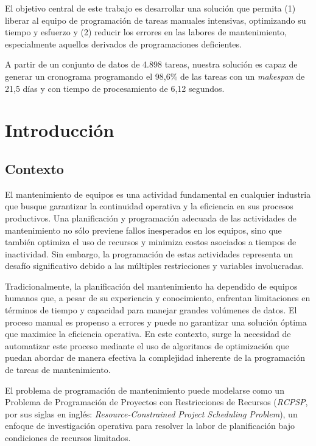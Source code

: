 \documentclass{article}
\begin{document}
El objetivo central de este trabajo es desarrollar una solución que permita (1) liberar al equipo de programación de tareas manuales intensivas, optimizando su tiempo y esfuerzo y (2) reducir los errores en las labores de mantenimiento, especialmente aquellos derivados de programaciones deficientes.

A partir de un conjunto de datos de 4.898 tareas, nuestra solución es capaz de generar un cronograma programando el 98,6\% de las tareas con un \textit{makespan} de 21,5 días y con tiempo de procesamiento de 6,12 segundos.
\newpage

\tableofcontents[hideallsubsections]
\newpage

\section{Introducción}

\subsection{Contexto}
El mantenimiento de equipos es una actividad fundamental en cualquier industria que busque garantizar la continuidad operativa y la eficiencia en sus procesos productivos. Una planificación y programación adecuada de las actividades de mantenimiento no sólo previene fallos inesperados en los equipos, sino que también optimiza el uso de recursos y minimiza costos asociados a tiempos de inactividad. Sin embargo, la programación de estas actividades representa un desafío significativo debido a las múltiples restricciones y variables involucradas.

Tradicionalmente, la planificación del mantenimiento ha dependido de equipos humanos que, a pesar de su experiencia y conocimiento, enfrentan limitaciones en términos de tiempo y capacidad para manejar grandes volúmenes de datos. El proceso manual es propenso a errores y puede no garantizar una solución óptima que maximice la eficiencia operativa. En este contexto, surge la necesidad de automatizar este proceso mediante el uso de algoritmos de optimización que puedan abordar de manera efectiva la complejidad inherente de la programación de tareas de mantenimiento.

El problema de programación de mantenimiento puede modelarse como un Problema de Programación de Proyectos con Restricciones de Recursos (\textit{RCPSP}, por sus siglas en inglés: \textit{Resource-Constrained Project Scheduling Problem}), un enfoque de investigación operativa para resolver la labor de planificación bajo condiciones de recursos limitados.
\end{document}
